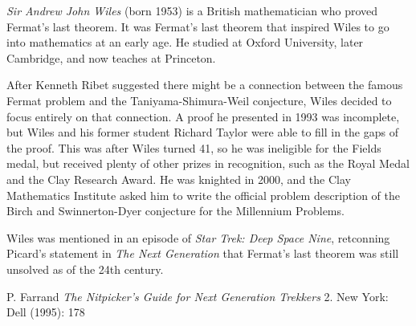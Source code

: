 \documentclass[12pt]{article}
\begin{document}

\emph{Sir Andrew John Wiles} (born 1953) is a British mathematician who proved Fermat's last theorem. It was Fermat's last theorem that inspired Wiles to go into mathematics at an early age. He studied at Oxford University, later Cambridge, and now teaches at Princeton.

After Kenneth Ribet suggested there might be a connection between the famous Fermat problem and the Taniyama-Shimura-Weil conjecture, Wiles decided to focus entirely on that connection.  A proof he presented in 1993 was incomplete, but Wiles and his former student Richard Taylor were able to fill in the gaps of the proof.  This was after Wiles turned 41, so he was ineligible for the Fields medal, but received plenty of other prizes in recognition, such as the Royal Medal and the Clay Research Award. He was knighted in 2000, and the Clay Mathematics Institute asked him to write the official problem description of the Birch and Swinnerton-Dyer conjecture for the Millennium Problems.

Wiles was mentioned in an episode of {\it Star Trek: Deep Space Nine}, retconning Picard's statement in {\it The Next Generation} that Fermat's last theorem was still unsolved as of the 24th century.

\begin{thebibliography}{1}
 P. Farrand {\it The Nitpicker's Guide for Next Generation Trekkers} 2. New York: Dell (1995): 178
\end{thebibliography}


\end{document}
